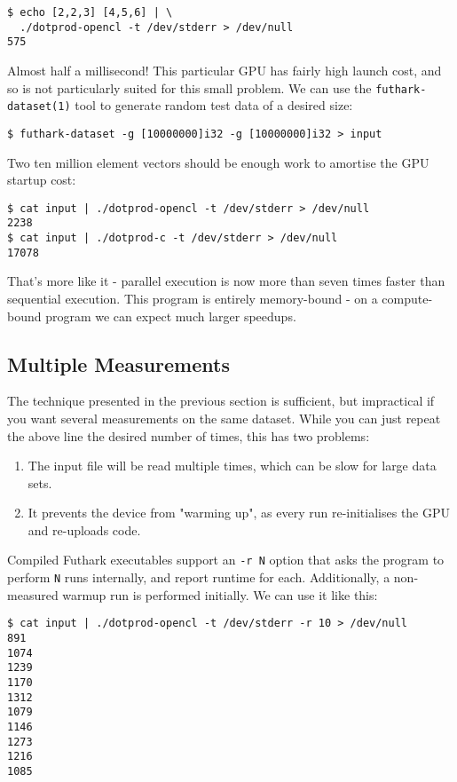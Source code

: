 \documentclass[oneside,11pt]{book}
\begin{document}
\begin{verbatim}
$ echo [2,2,3] [4,5,6] | \
  ./dotprod-opencl -t /dev/stderr > /dev/null
575
\end{verbatim}

Almost half a millisecond!  This particular GPU has fairly high launch
cost, and so is not particularly suited for this small problem.  We
can use the \texttt{futhark-dataset(1)} tool to generate random test
data of a desired size:

\begin{verbatim}
$ futhark-dataset -g [10000000]i32 -g [10000000]i32 > input
\end{verbatim}

Two ten million element vectors should be enough work to amortise the
GPU startup cost:

\begin{verbatim}
$ cat input | ./dotprod-opencl -t /dev/stderr > /dev/null
2238
$ cat input | ./dotprod-c -t /dev/stderr > /dev/null
17078
\end{verbatim}

That's more like it - parallel execution is now more than seven times
faster than sequential execution.  This program is entirely
memory-bound - on a compute-bound program we can expect much larger
speedups.

\subsection{Multiple Measurements}

The technique presented in the previous section is sufficient, but
impractical if you want several measurements on the same dataset.
While you can just repeat the above line the desired number of times,
this has two problems:

\begin{enumerate}
\item The input file will be read multiple times, which can be slow
  for large data sets.
\item It prevents the device from "warming up", as every run
  re-initialises the GPU and re-uploads code.
\end{enumerate}

Compiled Futhark executables support an \texttt{-r N} option that asks
the program to perform \texttt{N} runs internally, and report runtime
for each.  Additionally, a non-measured warmup run is performed
initially.  We can use it like this:

\begin{verbatim}
$ cat input | ./dotprod-opencl -t /dev/stderr -r 10 > /dev/null
891
1074
1239
1170
1312
1079
1146
1273
1216
1085
\end{verbatim}
\end{document}
